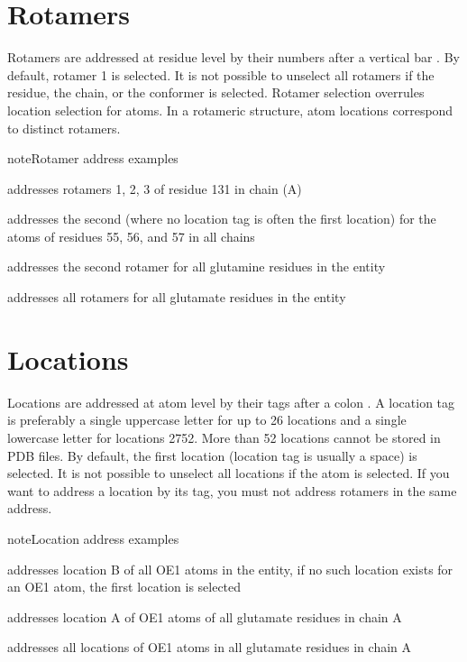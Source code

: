 \documentclass[letterpaper,10pt,english]{sphinxmanual}
\begin{document}
\section{Rotamers}
\label{\detokenize{MMMx_addresses:rotamers}}
Rotamers are addressed at residue level by their numbers after a vertical bar \sphinxcode{\sphinxupquote{|}}.
By default, rotamer 1 is selected. It is not possible to unselect all rotamers if the residue, the chain, or the conformer is selected.
Rotamer selection overrules location selection for atoms. In a rotameric structure, atom locations correspond to distinct rotamers.

\begin{sphinxadmonition}{note}{Rotamer address examples}

  addresses rotamers 1, 2, 3 of residue 131 in chain (A)

 addresses the second  (where no location tag is often the first location) for the  atoms of residues 55, 56, and 57 in all chains

 addresses the second rotamer for all glutamine residues in the entity

 addresses all rotamers for all glutamate residues in the entity
\end{sphinxadmonition}


\section{Locations}
\label{\detokenize{MMMx_addresses:locations}}
Locations are addressed at atom level by their tags after a colon \sphinxcode{\sphinxupquote{:}}.
A location tag is preferably a single upper\sphinxhyphen{}case letter for up to 26 locations and a single lower\sphinxhyphen{}case letter for locations 27\sphinxhyphen{}52. More than 52 locations cannot be stored in PDB files.
By default, the first location (location tag is usually a space) is selected. It is not possible to unselect all locations if the atom is selected.
If you want to address a location by its tag, you must not address rotamers in the same address.

\begin{sphinxadmonition}{note}{Location address examples}

  addresses location B of all OE1 atoms in the entity, if no such location exists for an OE1 atom, the first location is selected

 addresses location A of OE1 atoms of all glutamate residues in chain A

 addresses all locations of OE1 atoms in all glutamate residues in chain A
\end{sphinxadmonition}
\end{document}
